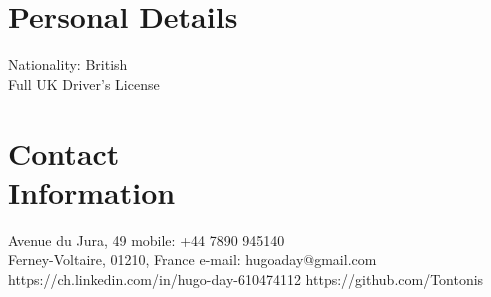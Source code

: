 \documentclass[margin,line]{resume}
\begin{document}
\begin{resume}

    \section{\mysidestyle Personal Details}
    Nationality: British \vspace{0mm}\\\vspace{-4.5mm}%
    Full UK Driver's License  \vspace{0mm}\\\vspace{-4.5mm}%


    \section{\mysidestyle Contact\\Information}
    Avenue du Jura, 49                            \hfill mobile: +44 7890 945140          \vspace{0mm}\\\vspace{0mm}%
    Ferney-Voltaire, 01210, France                          \hfill e-mail: hugoaday@gmail.com  \vspace{0mm}\\\vspace{-4.5mm} %
https://ch.linkedin.com/in/hugo-day-610474112    \hfill https://github.com/Tontonis  \vspace{0mm}\\\vspace{-4.5mm}%
\\

%

\end{resume}
\end{document}
